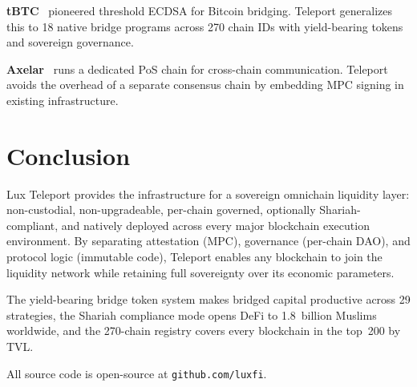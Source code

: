 \documentclass[11pt]{article}
\begin{document}
\textbf{tBTC}~\cite{tbtc} pioneered threshold ECDSA for Bitcoin bridging. Teleport generalizes this to 18 native bridge programs across 270 chain IDs with yield-bearing tokens and sovereign governance.

\textbf{Axelar}~\cite{axelar} runs a dedicated PoS chain for cross-chain communication. Teleport avoids the overhead of a separate consensus chain by embedding MPC signing in existing infrastructure.

\section{Conclusion}
\label{sec:conclusion}

Lux Teleport provides the infrastructure for a sovereign omnichain liquidity layer: non-custodial, non-upgradeable, per-chain governed, optionally Shariah-compliant, and natively deployed across every major blockchain execution environment. By separating attestation (MPC), governance (per-chain DAO), and protocol logic (immutable code), Teleport enables any blockchain to join the liquidity network while retaining full sovereignty over its economic parameters.

The yield-bearing bridge token system makes bridged capital productive across 29 strategies, the Shariah compliance mode opens DeFi to 1.8~billion Muslims worldwide, and the 270-chain registry covers every blockchain in the top~200 by TVL.

All source code is open-source at \texttt{github.com/luxfi}.
\end{document}
